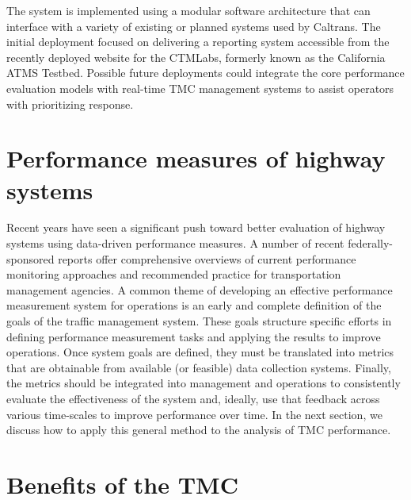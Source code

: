 \documentclass[12pt]{report}
\newcounter{time}
\begin{document}
The system is implemented using a modular software architecture that
can interface with a variety of existing or planned systems used by
Caltrans. The initial deployment focused on delivering a reporting
system accessible from the recently deployed website for the
\ac{CTMLabs}, formerly known as the California \ac{ATMS}
Testbed. Possible future deployments could integrate the core
performance evaluation models with real-time \ac{TMC} management
systems to assist operators with prioritizing response.




\section{Performance measures of highway systems}
\label{sec:perf-hw-sys}

Recent years have seen a significant push toward better evaluation of
highway systems using data-driven performance measures. A number of
recent federally-sponsored reports offer comprehensive overviews of
current performance monitoring approaches and recommended practice for
transportation management agencies. A common theme of developing an
effective performance measurement system for operations is an early
and complete definition of the goals of the traffic management
system. These goals structure specific efforts in defining performance
measurement tasks and applying the results to improve operations. Once
system goals are defined, they must be translated into metrics that
are obtainable from available (or feasible) data collection systems.
Finally, the metrics should be integrated into management and
operations to consistently evaluate the effectiveness of the system
and, ideally, use that feedback across various time-scales to improve
performance over time. In the next section, we discuss how to apply
this general method to the analysis of \ac{TMC} performance.

\section{Benefits of the TMC}
\label{sec:tmc-bene}
\end{document}
